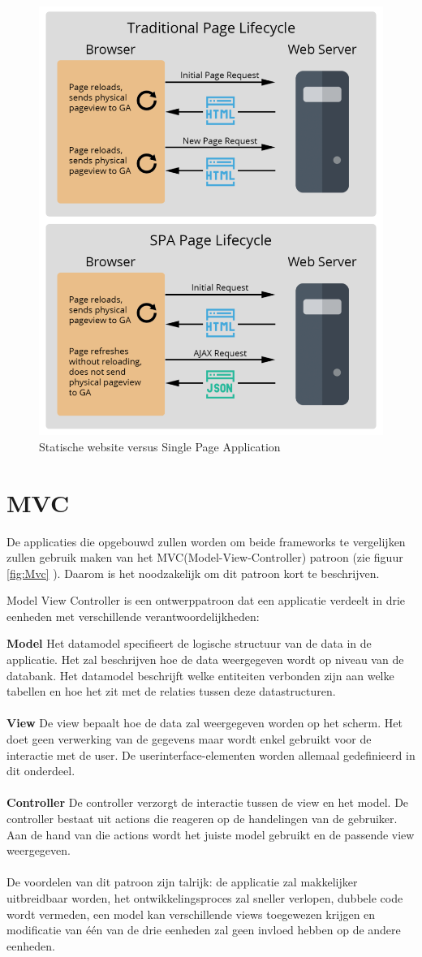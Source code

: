 \begin{figure}[H]
	\centering
	\includegraphics[width=0.5\linewidth]{spa-architecture}
	\caption{Statische website versus Single Page Application \autocite{E-nor2018}}
	\label{fig:SPA}
\end{figure}

\section{MVC}
De applicaties die opgebouwd zullen worden om beide frameworks te vergelijken zullen gebruik maken van het MVC(Model-View-Controller) patroon (zie figuur \ref{fig:Mvc} ). Daarom is het noodzakelijk om dit patroon kort te beschrijven.


Model View Controller is een ontwerppatroon dat een applicatie verdeelt in drie eenheden met verschillende verantwoordelijkheden:

	\textbf{Model}  \hspace{1cm} Het datamodel specifieert de logische structuur van de data in de applicatie. Het zal beschrijven hoe de data weergegeven wordt op niveau van de databank. Het datamodel beschrijft welke entiteiten verbonden zijn aan welke tabellen en hoe het zit met de relaties tussen deze datastructuren.   					\\ \\
	\textbf{View} \hspace{1cm} De view bepaalt hoe de data zal weergegeven worden op het scherm. Het doet geen verwerking van de gegevens maar wordt enkel gebruikt voor de interactie met de user. De userinterface-elementen worden allemaal gedefinieerd in dit onderdeel. 						\\	\\
	\textbf{Controller} \hspace{1cm} De controller verzorgt de interactie tussen de view en het model. De controller bestaat uit actions die reageren op de handelingen van de gebruiker. Aan de hand van die actions wordt het juiste model gebruikt en de passende view weergegeven.  			\\	\\
De voordelen van dit patroon zijn talrijk: de applicatie zal makkelijker uitbreidbaar worden, het ontwikkelingsproces zal sneller verlopen, dubbele code wordt vermeden, een model kan verschillende views toegewezen krijgen en modificatie van één van de drie eenheden zal geen invloed hebben op de andere eenheden.

